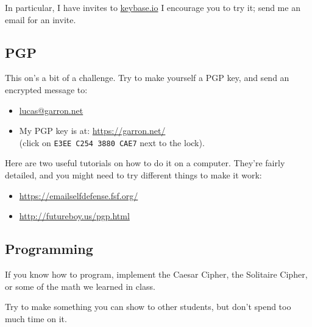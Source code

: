 \documentclass[12pt]{article}
\begin{document}
In particular, I have invites to \href{https://keybase.io/}{keybase.io}
I encourage you to try it; send me an email for an invite.


\subsection*{PGP}

This on's a bit of a challenge. Try to make yourself a PGP key, and send an encrypted message to:

\begin{itemize}
\item \href{mailto:lucas@garron.net}{lucas@garron.net}
\item My PGP key is at: \href{https://garron.net/lucas/lgarron-3880CAE7.asc}{https://garron.net/}\\(click on {\tt{E3EE C254 3880 CAE7}} next to the lock).
\end{itemize}


Here are two useful tutorials on how to do it on a computer. They're fairly detailed, and you might need to try different things to make it work:

\begin{itemize}
\item \href{https://emailselfdefense.fsf.org/}{https://emailselfdefense.fsf.org/}
\item \href{http://futureboy.us/pgp.html}{http://futureboy.us/pgp.html}
\end{itemize}

\subsection*{Programming}

If you know how to program, implement the Caesar Cipher, the Solitaire Cipher, or some of the math we learned in class.

Try to make something you can show to other students, but don't spend too much time on it.
\end{document}
